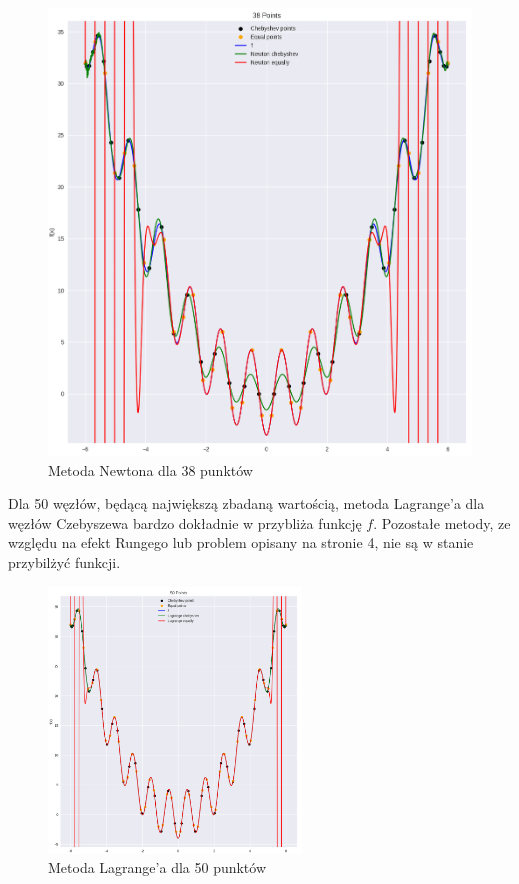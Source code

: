 \documentclass{article}
\begin{document}
\begin{figure}[H]
    \centering
    \includegraphics[width=\textwidth]{img/newt_38.png}
    \caption{Metoda Newtona dla 38 punktów}
\end{figure}

Dla 50 węzłów, będącą największą zbadaną wartością, metoda Lagrange'a dla węzłów Czebyszewa bardzo dokładnie w przybliża
funkcję $f$. Pozostałe metody, ze względu na efekt Rungego lub problem opisany na stronie 4, nie są w stanie przybilżyć funkcji.

\begin{figure}[H]
    \centering
    \includegraphics[width=0.6\textwidth]{img/lagr_50.png}
    \caption{Metoda Lagrange'a dla 50 punktów}
\end{figure}
\end{document}
